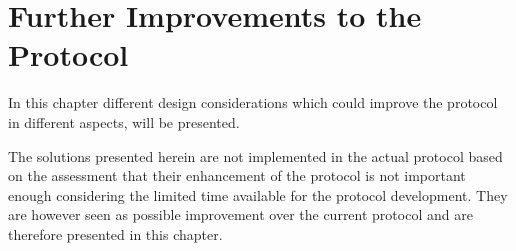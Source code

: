 \chapter{Further Improvements to the Protocol}\label{mortenStuff}
In this chapter different design considerations which could improve the protocol in different aspects, will be presented.

The solutions presented herein are not implemented in the actual protocol based on the assessment that their enhancement of the protocol is not important enough considering the limited time available for the protocol development. 
They are however seen as possible improvement over the current protocol and are therefore presented in this chapter. 



